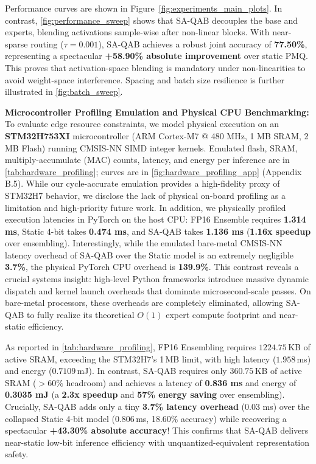 Performance curves are shown in Figure~\ref{fig:experiments_main_plots}. In contrast, \cref{fig:performance_sweep} shows that SA-QAB decouples the base and experts, blending activations sample-wise after non-linear blocks. With near-sparse routing ($\tau=0.001$), SA-QAB achieves a robust joint accuracy of \textbf{77.50\%}, representing a spectacular \textbf{+58.90\% absolute improvement} over static PMQ. This proves that activation-space blending is mandatory under non-linearities to avoid weight-space interference. Spacing and batch size resilience is further illustrated in \cref{fig:batch_sweep}.

\textbf{Microcontroller Profiling Emulation and Physical CPU Benchmarking:} To evaluate edge resource constraints, we model physical execution on an \textbf{STM32H753XI} microcontroller (ARM Cortex-M7 @ 480 MHz, 1 MB SRAM, 2 MB Flash) running CMSIS-NN SIMD integer kernels. Emulated flash, SRAM, multiply-accumulate (MAC) counts, latency, and energy per inference are in \cref{tab:hardware_profiling}; curves are in \cref{fig:hardware_profiling_app} (Appendix B.5). While our cycle-accurate emulation provides a high-fidelity proxy of STM32H7 behavior, we disclose the lack of physical on-board profiling as a limitation and high-priority future work. In addition, we physically profiled execution latencies in PyTorch on the host CPU: FP16 Ensemble requires \textbf{1.314 ms}, Static 4-bit takes \textbf{0.474 ms}, and SA-QAB takes \textbf{1.136 ms} (\textbf{1.16x speedup} over ensembling). Interestingly, while the emulated bare-metal CMSIS-NN latency overhead of SA-QAB over the Static model is an extremely negligible \textbf{3.7\%}, the physical PyTorch CPU overhead is \textbf{139.9\%}. This contrast reveals a crucial systems insight: high-level Python frameworks introduce massive dynamic dispatch and kernel launch overheads that dominate microsecond-scale passes. On bare-metal processors, these overheads are completely eliminated, allowing SA-QAB to fully realize its theoretical $O(1)$ expert compute footprint and near-static efficiency.

As reported in \cref{tab:hardware_profiling}, FP16 Ensembling requires $1224.75$\,KB of active SRAM, exceeding the STM32H7's 1\,MB limit, with high latency ($1.958$\,ms) and energy ($0.7109$\,mJ). In contrast, SA-QAB requires only $360.75$\,KB of active SRAM ($>60\%$ headroom) and achieves a latency of \textbf{0.836 ms} and energy of \textbf{0.3035 mJ} (a \textbf{2.3x speedup} and \textbf{57\% energy saving} over ensembling). Crucially, SA-QAB adds only a tiny \textbf{3.7\% latency overhead} (0.03 ms) over the collapsed Static 4-bit model ($0.806$\,ms, 18.60\% accuracy) while recovering a spectacular \textbf{+43.30\% absolute accuracy}! This confirms that SA-QAB delivers near-static low-bit inference efficiency with unquantized-equivalent representation safety.

